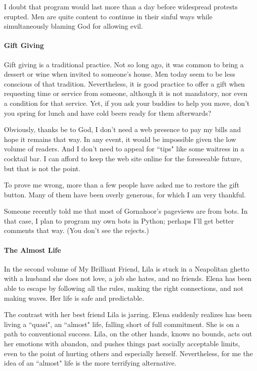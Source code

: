 I doubt that program would last more than a day before widespread protests erupted. Men are quite content to continue in their sinful ways while simultaneously blaming God for allowing evil.

\paragraph{Gift Giving}
Gift giving is a traditional practice. Not so long ago, it was common to bring a dessert or wine when invited to someone's house. Men today seem to be less conscious of that tradition. Nevertheless, it is good practice to offer a gift when requesting time or service from someone, although it is not mandatory, nor even a condition for that service. Yet, if you ask your buddies to help you move, don't you spring for lunch and have cold beers ready for them afterwards?

Obviously, thanks be to God, I don't need a web presence to pay my bills and hope it remains that way. In any event, it would be impossible given the low volume of readers. And I don't need to appeal for ``tips" like some waitress in a cocktail bar. I can afford to keep the web site online for the foreseeable future, but that is not the point.

To prove me wrong, more than a few people have asked me to restore the gift button. Many of them have been overly generous, for which I am very thankful.

Someone recently told me that most of Gornahoor's pageviews are from bots. In that case, I plan to program my own bots in Python; perhaps I'll get better comments that way. (You don't see the rejects.)

\paragraph{The Almost Life}
In the second volume of My Brilliant Friend, Lila is stuck in a Neapolitan ghetto with a husband she does not love, a job she hates, and no friends. Elena has been able to escape by following all the rules, making the right connections, and not making waves. Her life is safe and predictable.

The contrast with her best friend Lila is jarring. Elena suddenly realizes has been living a ``quasi", an ``almost" life, falling short of full commitment. She is on a path to conventional success. Lila, on the other hands, knows no bounds, acts out her emotions with abandon, and pushes things past socially acceptable limits, even to the point of hurting others and especially herself. Nevertheless, for me the idea of an ``almost" life is the more terrifying alternative.

